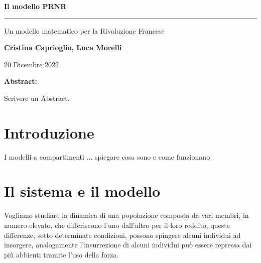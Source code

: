 \begin{center}
	\huge \textbf{Il modello PRNR}
	
	\rule{7cm}{0.4pt} 
	
	\LARGE Un modello matematico per la Rivoluzione Francese
	
	\vspace{20pt}
	
	\LARGE \textbf{Cristina Caprioglio, Luca Morelli}
	
	\vspace{5pt}
	
	\LARGE 20 Dicembre 2022
	
	\vspace{20pt}
 
	\normalsize\textbf{Abstract:}\\
\end{center}
Scrivere un Abstract.

\vspace{20pt}

\section*{Introduzione}
I modelli a compartimenti ... spiegare cosa sono e come funzionano
\section{Il sistema e il modello}
Vogliamo studiare la dinamica di una popolazione composta da vari membri, in numero elevato, che differiscono l'uno dall'altro per il loro reddito, queste differenze, sotto determinate condizioni, possono spingere alcuni individui ad insorgere, analogamente l'insurrezione di alcuni individui può essere repressa dai più abbienti tramite l'uso della forza.\\

